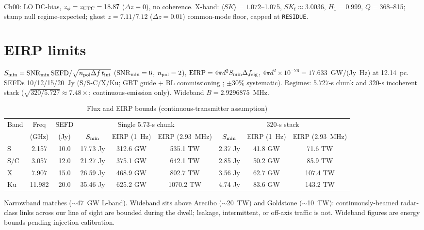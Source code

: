 \documentclass[twocolumn]{aastex631}
\begin{document}
Ch00: LO DC-bias, $z_\phi=z_{\rm UTC}=18.87$ ($\Delta z\equiv0$), no coherence. X-band: $\langle SK\rangle=1.072$--1.075, $SK_t\approx3.0036$, $H_1=0.999$, $Q=368$--815; stamp null regime-expected; ghost $z=7.11/7.12$ ($\Delta z=0.01$) common-mode floor, capped at \texttt{RESIDUE}.

\section{EIRP limits}
\label{sec:limits}

$S_{\rm min}={\rm SNR_{min}\,SEFD}/\sqrt{n_{\rm pol}\Delta f\,t_{\rm int}}$ (SNR$_{\rm min}=6$, $n_{\rm pol}=2$), ${\rm EIRP}=4\pi d^2S_{\rm min}\Delta f_{\rm sig}$, $4\pi d^2\times10^{-26}=17.633$~GW/(Jy~Hz) at 12.14~pc. SEFDs 10/12/15/20~Jy (S/S-C/X/Ku; GBT guide \citep{gbtguide} + BL commissioning \citep{lebofsky2019}; $\pm30$\% systematic). Regimes: 5.727-s chunk and 320-s incoherent stack ($\sqrt{320/5.727}\approx7.48\times$; continuous-emission only). Wideband $B=2.9296875$~MHz.

\begin{table}[t]
\centering
\caption{Flux and EIRP bounds (continuous-transmitter assumption)}
\label{tab:limits}
\begin{tabular}{lcccccccc}
\toprule
Band & Freq & SEFD & \multicolumn{3}{c}{Single 5.73-s chunk} & \multicolumn{3}{c}{320-s stack} \\
 & (GHz) & (Jy) & $S_{\rm min}$ & EIRP (1~Hz) & EIRP (2.93~MHz) & $S_{\rm min}$ & EIRP (1~Hz) & EIRP (2.93~MHz) \\
\midrule
S   & 2.157  & 10.0 & 17.73 Jy & 312.6 GW & 535.1 TW & 2.37 Jy & 41.8 GW & 71.6 TW \\
S/C & 3.057  & 12.0 & 21.27 Jy & 375.1 GW & 642.1 TW & 2.85 Jy & 50.2 GW & 85.9 TW \\
X   & 7.907  & 15.0 & 26.59 Jy & 468.9 GW & 802.7 TW & 3.56 Jy & 62.7 GW & 107.4 TW \\
Ku  & 11.982 & 20.0 & 35.46 Jy & 625.2 GW & 1070.2 TW & 4.74 Jy & 83.6 GW & 143.2 TW \\
\bottomrule
\end{tabular}
\end{table}

Narrowband matches \citet{pinchuk2019} ($\sim$47~GW L-band). Wideband sits above Arecibo ($\sim$20~TW) and Goldstone ($\sim$10~TW): continuously-beamed radar-class links across our line of sight are bounded during the dwell; leakage, intermittent, or off-axis traffic is not. Wideband figures are energy bounds pending injection calibration.
\end{document}
